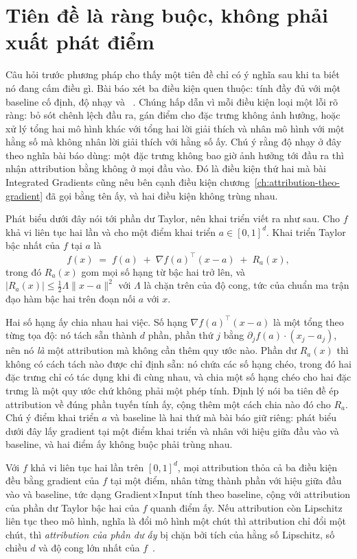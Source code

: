 \section{Tiên đề là ràng buộc, không phải xuất phát điểm}
\label{sec:ch06-tien-de}

%
%
Câu hỏi trước phương pháp cho thấy một tiên đề chỉ có ý nghĩa sau khi ta biết
nó đang cấm điều gì. Bài báo xét ba điều kiện quen thuộc: tính đầy đủ với một
baseline cố định, độ nhạy và ~\autocite{p17firstprinciples}.
Chúng hấp dẫn vì mỗi điều kiện loại một lỗi rõ ràng: bỏ sót chênh lệch đầu ra,
gán điểm cho đặc trưng không ảnh hưởng, hoặc xử lý tổng hai mô hình khác với
tổng hai lời giải thích và nhân mô hình với một hằng số mà không nhân lời giải
thích với hằng số ấy. Chú ý rằng độ nhạy ở đây theo nghĩa bài báo dùng: một
đặc trưng không bao giờ ảnh hưởng tới đầu ra thì nhận attribution bằng không ở
mọi đầu vào. Đó là điều kiện thứ hai mà bài Integrated Gradients cũng nêu bên
cạnh điều kiện chương~\ref{ch:attribution-theo-gradient} đã gọi bằng tên ấy,
và hai điều kiện không trùng nhau.

Phát biểu dưới đây nói tới phần dư Taylor, nên khai triển viết ra như sau. Cho
$f$ khả vi liên tục hai lần và cho một điểm khai triển
$a \in [0,1]^d$. Khai triển Taylor bậc nhất của $f$ tại $a$ là
\[
  f(x) \;=\; f(a) \;+\; \nabla f(a)^{\top}(x-a) \;+\; R_a(x),
\]
trong đó $R_a(x)$ gom mọi số hạng từ bậc hai trở lên, và
$|R_a(x)| \le \tfrac{1}{2} \Lambda \lVert x-a \rVert^2$ với $\Lambda$ là chặn
trên của độ cong, tức của chuẩn ma trận đạo hàm bậc hai trên đoạn nối $a$ với
$x$.

Hai số hạng ấy chia nhau hai việc. Số hạng $\nabla f(a)^{\top}(x-a)$ là một tổng
theo từng tọa độ: nó tách sẵn
thành $d$ phần, phần thứ $j$ bằng $\partial_j f(a) \cdot (x_j - a_j)$, nên nó
\emph{là} một attribution mà không cần thêm quy ước nào. Phần dư $R_a(x)$ thì
không có cách tách nào được chỉ định sẵn: nó chứa các số hạng chéo, trong đó hai
đặc trưng chỉ có tác dụng khi đi cùng nhau, và chia một số hạng chéo cho hai đặc
trưng là một quy ước chứ không phải một phép tính. Định lý nói ba tiên đề ép
attribution về đúng phần tuyến tính ấy, cộng thêm một cách chia nào đó cho
$R_a$. Chú ý điểm khai triển $a$ và baseline là hai thứ mà bài báo giữ riêng:
phát biểu dưới đây lấy gradient tại một điểm khai triển và nhân với hiệu giữa
đầu vào và baseline, và hai điểm ấy không buộc phải trùng nhau.

\begin{theorem}
\label{thm:ch06-ba-tien-de}
Với $f$ khả vi liên tục hai lần trên $[0,1]^d$, mọi attribution thỏa cả ba
điều kiện đều bằng gradient của $f$ tại một điểm, nhân từng thành phần với
hiệu giữa đầu vào và baseline, tức dạng Gradient$\mathbin{\times}$Input tính
theo baseline, cộng với attribution của phần dư Taylor bậc hai của $f$ quanh
điểm ấy. Nếu attribution còn Lipschitz liên tục theo mô hình, nghĩa là đổi mô
hình một chút thì attribution chỉ đổi một chút, thì \emph{attribution của phần
dư ấy} bị chặn bởi tích của
hằng số Lipschitz, số chiều $d$ và độ cong lớn nhất của
$f$~\autocite{p17firstprinciples}.
\end{theorem}

